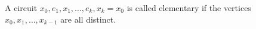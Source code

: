 A circuit $x_0, e_1, x_1, \ldots, e_k, x_k = x_0$ is called elementary if the vertices $x_0, x_1, \ldots, x_{k-1}$ are all distinct.
